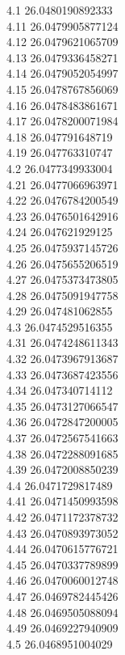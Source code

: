 {4.1	26.0480190892333\\
4.11	26.0479905877124\\
4.12	26.0479621065709\\
4.13	26.0479336458271\\
4.14	26.0479052054997\\
4.15	26.0478767856069\\
4.16	26.0478483861671\\
4.17	26.0478200071984\\
4.18	26.047791648719\\
4.19	26.047763310747\\
4.2	26.0477349933004\\
4.21	26.0477066963971\\
4.22	26.0476784200549\\
4.23	26.0476501642916\\
4.24	26.047621929125\\
4.25	26.0475937145726\\
4.26	26.0475655206519\\
4.27	26.0475373473805\\
4.28	26.0475091947758\\
4.29	26.047481062855\\
4.3	26.0474529516355\\
4.31	26.0474248611343\\
4.32	26.0473967913687\\
4.33	26.0473687423556\\
4.34	26.047340714112\\
4.35	26.0473127066547\\
4.36	26.0472847200005\\
4.37	26.0472567541663\\
4.38	26.0472288091685\\
4.39	26.0472008850239\\
4.4	26.0471729817489\\
4.41	26.0471450993598\\
4.42	26.0471172378732\\
4.43	26.0470893973052\\
4.44	26.0470615776721\\
4.45	26.0470337789899\\
4.46	26.0470060012748\\
4.47	26.0469782445426\\
4.48	26.0469505088094\\
4.49	26.0469227940909\\
4.5	26.0468951004029\\
}
